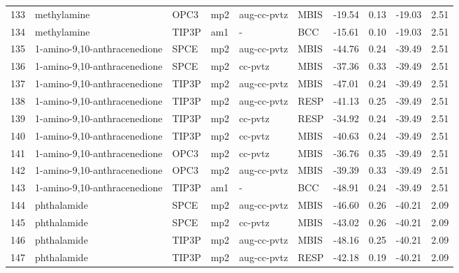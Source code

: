 \begin{tabular}{llllllrrrr}
133 &                    methylamine &       OPC3 &      mp2 &  aug-cc-pvtz &         MBIS & -19.54 &      0.13 &      -19.03 &     2.51 \\
134 &                    methylamine &      TIP3P &      am1 &            - &          BCC & -15.61 &      0.10 &      -19.03 &     2.51 \\
135 &   1-amino-9,10-anthracenedione &       SPCE &      mp2 &  aug-cc-pvtz &         MBIS & -44.76 &      0.24 &      -39.49 &     2.51 \\
136 &   1-amino-9,10-anthracenedione &       SPCE &      mp2 &      cc-pvtz &         MBIS & -37.36 &      0.33 &      -39.49 &     2.51 \\
137 &   1-amino-9,10-anthracenedione &      TIP3P &      mp2 &  aug-cc-pvtz &         MBIS & -47.01 &      0.24 &      -39.49 &     2.51 \\
138 &   1-amino-9,10-anthracenedione &      TIP3P &      mp2 &  aug-cc-pvtz &         RESP & -41.13 &      0.25 &      -39.49 &     2.51 \\
139 &   1-amino-9,10-anthracenedione &      TIP3P &      mp2 &      cc-pvtz &         RESP & -34.92 &      0.24 &      -39.49 &     2.51 \\
140 &   1-amino-9,10-anthracenedione &      TIP3P &      mp2 &      cc-pvtz &         MBIS & -40.63 &      0.24 &      -39.49 &     2.51 \\
141 &   1-amino-9,10-anthracenedione &       OPC3 &      mp2 &      cc-pvtz &         MBIS & -36.76 &      0.35 &      -39.49 &     2.51 \\
142 &   1-amino-9,10-anthracenedione &       OPC3 &      mp2 &  aug-cc-pvtz &         MBIS & -39.39 &      0.33 &      -39.49 &     2.51 \\
143 &   1-amino-9,10-anthracenedione &      TIP3P &      am1 &            - &          BCC & -48.91 &      0.24 &      -39.49 &     2.51 \\
144 &                    phthalamide &       SPCE &      mp2 &  aug-cc-pvtz &         MBIS & -46.60 &      0.26 &      -40.21 &     2.09 \\
145 &                    phthalamide &       SPCE &      mp2 &      cc-pvtz &         MBIS & -43.02 &      0.26 &      -40.21 &     2.09 \\
146 &                    phthalamide &      TIP3P &      mp2 &  aug-cc-pvtz &         MBIS & -48.16 &      0.25 &      -40.21 &     2.09 \\
147 &                    phthalamide &      TIP3P &      mp2 &  aug-cc-pvtz &         RESP & -42.18 &      0.19 &      -40.21 &     2.09 \\

\end{tabular}
